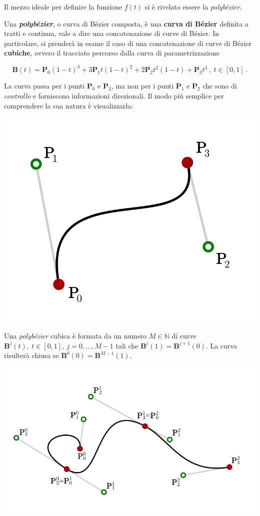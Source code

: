 \documentclass[
]{book}
\begin{document}
Il mezzo ideale per definire la funzione \(f(t)\) si è rivelato essere la \emph{polybézier}.

Una \textbf{\emph{polybézier}}, o curva di Bézier composta, è una \textbf{curva di Bézier} definita a tratti e continua, vale a dire una concatenazione di curve di Bézier. In particolare, si prenderà in esame il caso di una concatenazione di curve di Bézier \textbf{cubiche}, ovvero il tracciato percorso dalla curva di parametrizzazione

\begin{equation}
    \mathbf{B}(t)=\mathbf{P}_0(1-t)^3+3\mathbf{P}_1t(1-t)^2+2\mathbf{P}_2t^2(1-t)+\mathbf{P}_3t^3 \ , \ t \in [0,1] \ .
    \label{eq:bezier}
\end{equation}

La curva passa per i punti \(\mathbf{P}_0\) e \(\mathbf{P}_3\), ma non per i punti \(\mathbf{P}_1\) e \(\mathbf{P}_2\) che sono di \emph{controllo} e forniscono informazioni direzionali. Il modo più semplice per comprendere la sua natura è visualizzarla:

\begin{center}\includegraphics[width=0.36\linewidth]{_images/bezier} \end{center}

Una \emph{polybézier} cubica è formata da un numero \(M \in \mathbb{N}\) di curve \(\mathbf{B}^j(t), \ t \in [0,1], \ j=0,...,M-1\) tali che \(\mathbf{B}^j(1)=\mathbf{B}^{j+1}(0)\). La curva risulterà chiusa se \(\mathbf{B}^0(0)=\mathbf{B}^{M-1}(1)\).

\begin{center}\includegraphics[width=0.75\linewidth]{_images/polybezier} \end{center}
\end{document}
